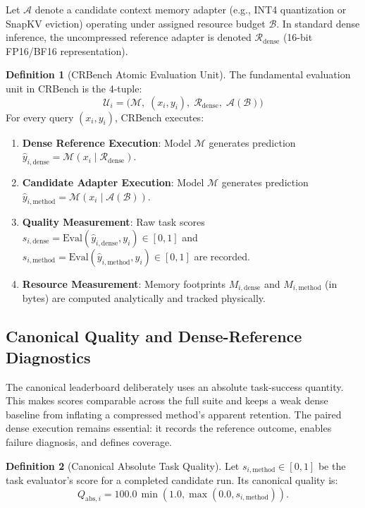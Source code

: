 \documentclass[10pt]{article}
\theoremstyle{definition}
\newtheorem{definition}{Definition}
\begin{document}
Let $\mathcal{A}$ denote a candidate context memory adapter (e.g., INT4 quantization or SnapKV eviction) operating under assigned resource budget $\mathcal{B}$. In standard dense inference, the uncompressed reference adapter is denoted $\mathcal{R}_{\text{dense}}$ (16-bit FP16/BF16 representation).

\begin{definition}[CRBench Atomic Evaluation Unit]
The fundamental evaluation unit in CRBench is the 4-tuple:
\begin{equation}
\label{eq:eval_unit}
\mathcal{U}_i = \Big( \mathcal{M}, \; (x_i, y_i), \; \mathcal{R}_{\text{dense}}, \; \mathcal{A}(\mathcal{B}) \Big)
\end{equation}
For every query $(x_i, y_i)$, CRBench executes:
\begin{enumerate}[leftmargin=*,itemsep=1.0pt]
    \item \textbf{Dense Reference Execution}: Model $\mathcal{M}$ generates prediction $\hat{y}_{i, \text{dense}} = \mathcal{M}(x_i \mid \mathcal{R}_{\text{dense}})$.
    \item \textbf{Candidate Adapter Execution}: Model $\mathcal{M}$ generates prediction $\hat{y}_{i, \text{method}} = \mathcal{M}(x_i \mid \mathcal{A}(\mathcal{B}))$.
    \item \textbf{Quality Measurement}: Raw task scores $s_{i, \text{dense}} = \text{Eval}(\hat{y}_{i, \text{dense}}, y_i) \in [0, 1]$ and $s_{i, \text{method}} = \text{Eval}(\hat{y}_{i, \text{method}}, y_i) \in [0, 1]$ are recorded.
    \item \textbf{Resource Measurement}: Memory footprints $M_{i, \text{dense}}$ and $M_{i, \text{method}}$ (in bytes) are computed analytically and tracked physically.
\end{enumerate}
\end{definition}

\subsection{Canonical Quality and Dense-Reference Diagnostics}
\label{sec:quality}
The canonical leaderboard deliberately uses an absolute task-success quantity. This makes scores comparable across the full suite and keeps a weak dense baseline from inflating a compressed method's apparent retention. The paired dense execution remains essential: it records the reference outcome, enables failure diagnosis, and defines coverage.

\begin{definition}[Canonical Absolute Task Quality]
Let $s_{i,\text{method}} \in [0,1]$ be the task evaluator's score for a completed candidate run. Its canonical quality is:
\begin{equation}
\label{eq:quality_absolute}
Q_{\text{abs},i}=100.0\,\min\left(1.0,\max\left(0.0,s_{i,\text{method}}\right)\right).
\end{equation}
\end{definition}
\end{document}
